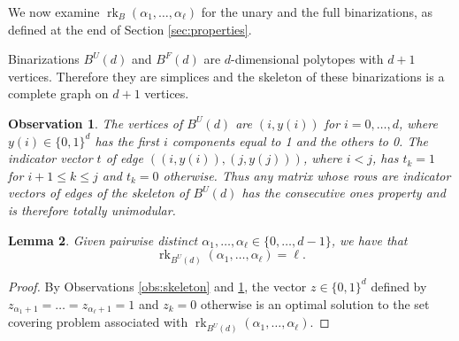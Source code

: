 \documentclass[11pt,a4paper]{article}
\newtheorem{theorem}{Theorem}[section]
\newtheorem{lemma}[theorem]{Lemma}
\newtheorem{observation}[theorem]{Observation}
\newcommand{\R}{\mathbb{R}}
\newcommand{\conv}{\operatorname{conv}}
\newcommand{\1}{\textbf{1}}
\newcommand{\rk}{\operatorname{rk}}
\newcommand\marco[1]{\textcolor{red}{\textbf{ MDS:  #1}}}
\begin{document}
  
  We now examine
  $\rk_B(\alpha_1,\dots,\alpha_{\ell})$ for the unary and the full binarizations, as defined at the end of Section \ref{sec:properties}.
  \smallskip


Binarizations $B^U(d)$ and $B^F(d)$ are $d$-dimensional polytopes with  $d+1$ vertices. Therefore they are simplices and the skeleton of these binarizations is a complete graph on $d+1$ vertices.

\begin{observation}\label{obs:unary}
 The vertices of $B^U(d)$ are $(i,y(i))$ for $i=0,\dots,d$, where $y(i)\in \{0,1\}^d$ has the first $i$ components equal to 1 and the others to 0. The indicator vector $t$ of edge  $((i,y(i)), (j,y(j)))$, where $i<j$, has $t_k=1$ for  $i+1\le k\le j$ and  $t_k=0$ otherwise.  Thus any  matrix whose rows are indicator vectors of edges of the skeleton of $B^U(d)$  has the consecutive ones property and is therefore totally unimodular. 
\end{observation}


\begin{lemma}\label{le:rank-unary} Given pairwise distinct  $\alpha_1,\dots,\alpha_{\ell}\in \{0,\dots,d-1\}$, we have that \[\rk_{B^U(d)}(\alpha_1,\dots,\alpha_{\ell})=\ell.\]
\end{lemma}
\begin{proof}
By Observations \ref{obs:skeleton} and \ref{obs:unary}, the vector $z\in\{0,1\}^d$ defined by $z_{\alpha_1+1}=\dots=z_{\alpha_{\ell}+1}=1$ and $z_k=0$ otherwise is an optimal solution to the set covering problem associated with $\rk_{B^U(d)}(\alpha_1,\dots,\alpha_{\ell})$.
\end{proof}


\end{document}
